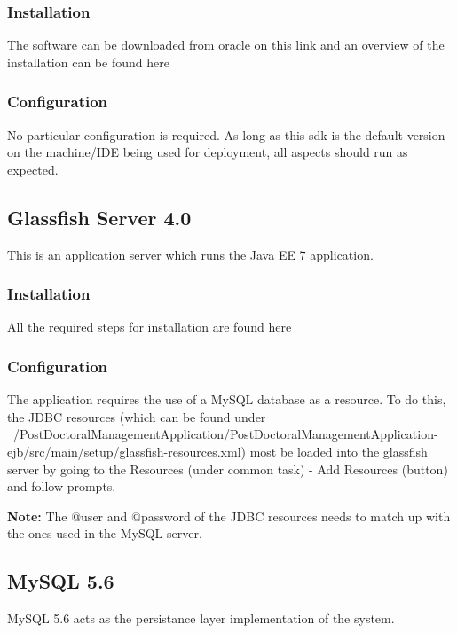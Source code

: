 \documentclass[12pt]{article}
\begin{document}
\subsubsection{Installation} 
The software can be downloaded from oracle on this link %
 and an overview of the installation can be found here %
  
\subsubsection{Configuration}
No particular configuration is required. As long as this sdk is the default version on the machine/IDE being used for deployment, all aspects should run as expected.

\subsection{Glassfish Server 4.0}
This is an application server which runs the Java EE 7 application.

\subsubsection{Installation}
All the required steps for installation are found here %

\subsubsection{Configuration}
The application requires the use of a MySQL database as a resource. To do this, the JDBC resources (which can be found under ~/PostDoctoralManagementApplication/PostDoctoralManagementApplication-ejb/src/main/setup/glassfish-resources.xml) most be loaded into the glassfish server by going to the Resources (under common task) - Add Resources (button)  and follow prompts. 

\textbf{Note:} The @user and @password of the JDBC resources needs to match up with the ones used in the MySQL server.  

\subsection{MySQL 5.6}
MySQL 5.6 acts as the persistance layer implementation of the system.
\end{document}
